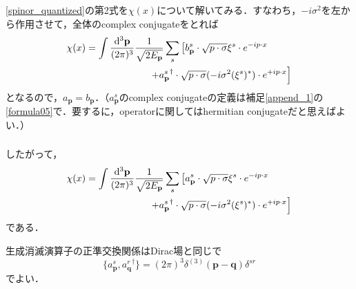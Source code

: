 \documentclass[pdflatex,unicode,ja=standard,12pt]{beamer}
\begin{document}
\begin{frame}%

  \frametitle{\subsecname}

  \eqref{spinor_quantized}の第2式を$\chi(x)$について解いてみる．すなわち，$-i\sigma^2$を左から作用させて，全体のcomplex conjugateをとれば
  \begin{align}
    \chi(x)
    &=    
    \int\frac{\dd^3 \mathbf{p}}{(2\pi)^3}
    \frac{1}{\sqrt{2E_{\mathbf{p}}}}
    \sum_s
    \left[  
      b_{\mathbf{p}}^s \cdot \sqrt{p\cdot \sigma}\xi^s \cdot e^{-ip\cdot x}
    \right.
    \nonumber
    \\
    &\hspace{2.3cm}
    \left.
      +
      {a_{\mathbf{p}}^s}^{\dag} \cdot \sqrt{p\cdot \sigma}(-i\sigma^2(\xi^s)^{*}) \cdot e^{+ip\cdot x}
    \right]
  \end{align}
  となるので，$a_{\mathbf{p}}=b_{\mathbf{p}}$．（$a_{\mathbf{p}}^s$のcomplex conjugateの定義は補足\ref{append_1}の\eqref{formula05}で．要するに，operatorに関してはhermitian conjugateだと思えばよい．）

\end{frame}

\begin{frame}%

  \frametitle{\subsecname}

  したがって，
  \begin{align}
    \chi(x)
    &=    
    \int\frac{\dd^3 \mathbf{p}}{(2\pi)^3}
    \frac{1}{\sqrt{2E_{\mathbf{p}}}}
    \sum_s
    \left[  
      a_{\mathbf{p}}^s \cdot \sqrt{p\cdot \sigma}\xi^s \cdot e^{-ip\cdot x}
    \right.
    \nonumber
    \\
    &\hspace{2.3cm}
    \left.
      +
      {a_{\mathbf{p}}^s}^{\dag} \cdot \sqrt{p\cdot \sigma}(-i\sigma^2(\xi^s)^{*}) \cdot e^{+ip\cdot x}
    \right]
    \label{spinor_quantized2}
  \end{align}
  である．

  生成消滅演算子の正準交換関係はDirac場と同じで
  \begin{equation}
    \{
      a_{\mathbf{p}}^s
      ,
      {a_{\mathbf{q}}^r}^{\dag}
    \}
    =
    (2\pi)^{3}
    \delta^{(3)}(\mathbf{p}-\mathbf{q})\delta^{sr}
    \label{anti_com}
  \end{equation}
  でよい．

\end{frame}
\end{document}
